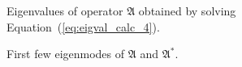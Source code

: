 
\begin{figure}[!htbp]
    \centering
    
    \caption{Eigenvalues of operator $\mathfrak{A}$ obtained by solving Equation~(\ref{eq:eigval_calc_4}).}
    \label{fig:eigval_dist}
\end{figure}

%     

\begin{figure}[!htbp]
    \centering
    
    \caption{First few eigenmodes of $\mathfrak{A}$ and $\mathfrak{A}^*$.}
    \label{fig:eigfun}
\end{figure}

